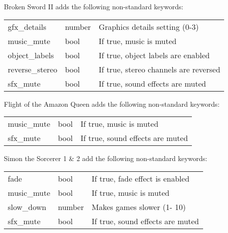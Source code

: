 Broken Sword II adds the following non-standard keywords:\\
\begin{tabular}[h]{lll}
        gfx\_details    &number  &Graphics details setting (0-3)\\
        music\_mute     &bool    &If true, music is muted\\
        object\_labels  &bool    &If true, object labels are enabled\\
        reverse\_stereo &bool    &If true, stereo channels are reversed\\
        sfx\_mute       &bool    &If true, sound effects are muted\\
\end{tabular}

Flight of the Amazon Queen adds the following non-standard keywords:\\
\begin{tabular}[h]{lll}
        music\_mute     &bool    &If true, music is muted\\
        sfx\_mute       &bool    &If true, sound effects are muted\\
\end{tabular}

Simon the Sorcerer 1 \& 2 add the following non-standard keywords:\\
\begin{tabular}[h]{lll}
        fade            &bool    &If true, fade effect is enabled\\
        music\_mute     &bool    &If true, music is muted\\
        slow\_down      &number  &Makes games slower (1- 10)\\
        sfx\_mute       &bool    &If true, sound effects are muted\\
\end{tabular}

